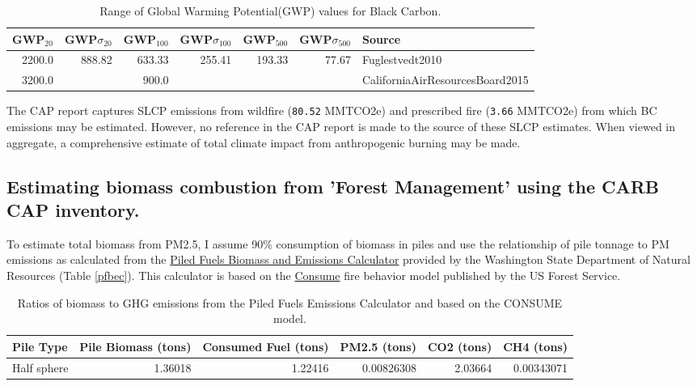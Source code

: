 \documentclass[a4paper]{article}
\begin{document}
\begin{table}[htb]
\centering
\begin{tabular}{rrrrrrl}
GWP\(_{\text{20}}\) & GWP\(\sigma_{\text{20}}\) & GWP\(_{\text{100}}\) & GWP\(\sigma_{\text{100}}\) & GWP\(_{\text{500}}\) & GWP\(\sigma_{\text{500}}\) & Source\\
\hline
2200.0 & 888.82 & 633.33 & 255.41 & 193.33 & 77.67 & Fuglestvedt2010\\
3200.0 &  & 900.0 &  &  &  & CaliforniaAirResourcesBoard2015\\
\end{tabular}
\caption{Range of Global Warming Potential(GWP) values for Black Carbon.\label{tab:bc_gwp}}

\end{table}


The \citet{CaliforniaAirResourcesBoard2015,CaliforniaAirResourcesBoard2016}
\ac{CAP} report captures \ac{SLCP} emissions from wildfire
(\texttt{80.52} MMTCO2e) and prescribed fire
(\texttt{3.66} MMTCO2e) from which \ac{BC} emissions may be estimated. However, no reference in the \ac{CAP} report is made to the source of these
SLCP estimates. When viewed in aggregate, a comprehensive estimate of total climate impact from anthropogenic burning may be made. 

\subsection{Estimating biomass combustion from 'Forest Management' using the \ac{CARB} \ac{CAP} inventory.}
\label{sec:orgheadline4}

To estimate total biomass from \ac{PM2.5}, I assume 90\% consumption of biomass in piles and use the relationship of pile tonnage to PM emissions as calculated from the \href{http://depts.washington.edu/nwfire/piles/}{Piled Fuels Biomass and Emissions Calculator} provided by the Washington State Department of Natural Resources (Table \ref{pfbec}). This calculator is based on the \href{http://www.fs.fed.us/pnw/fera/research/smoke/consume/index.shtml}{Consume} fire behavior model published by the US Forest Service. 

\begin{table}[htb]
\centering
\begin{tabular}{lrrrrr}
Pile Type & Pile Biomass (tons) & Consumed Fuel (tons) & PM2.5 (tons) & CO2 (tons) & CH4 (tons)\\
\hline
Half sphere & 1.36018 & 1.22416 & 0.00826308 & 2.03664 & 0.00343071\\
\end{tabular}
\caption{\label{tab:orgtable1}
Ratios of biomass to \ac{GHG} emissions from the Piled Fuels Emissions Calculator and based on the CONSUME model.}

\end{table}
\end{document}
